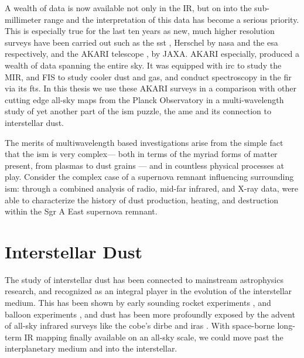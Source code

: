     A wealth of data is now available not only in the IR, but on into the sub-millimeter range and the interpretation of this data has become a serious priority. This is especially true for the last ten years as new, much higher resolution surveys have been carried out such as the \acrlong{sst} \cite{spitzer04}, \acrlong{Herschel} \citep{herschel10} by \acrshort{nasa} and the \acrshort{esa} respectively, and the AKARI telescope \citep{akari07},  by JAXA. AKARI especially, produced a wealth of data spanning the entire sky. It was equipped with \acrshort{irc} \citep{irc07} to study the MIR, and FIS \citep{fis07} to study cooler dust and gas, and conduct spectroscopy in the \acrlong{fir} via its \acrlong{fts}. In this thesis we use these AKARI surveys in a comparison with other cutting edge all-sky maps from the Planck Observatory in a multi-wavelength study of yet another part of the \acrshort{ism} puzzle, the \acrshort{ame} and its connection to interstellar dust.

    The merits of multiwavelength based investigations arise from the simple fact that the \acrshort{ism} is very complex--- both in terms of the myriad forms of matter present, from plasmas to dust grains --- and in countless physical processes at play. Consider the complex case of a supernova remnant influencing surrounding \acrshort{ism}: through a combined analysis of radio, mid-far infrared, and X-ray data, \cite{lau15} were able to characterize the history of dust production, heating, and destruction within the Sgr A East supernova remnant.


\section{Interstellar Dust}

    The study of interstellar dust has been connected to mainstream astrophysics research, and recognized as an integral player in the evolution of the interstellar medium. This has been shown by early sounding rocket experiments \citep{wolstencroft67,soifer71}, and balloon experiments \citep{muehlner70,emerson73}, and dust has been more profoundly exposed by the advent of all-sky infrared surveys like the \acrlong{cobe}'s \acrlong{dirbe} \citep{sodroski94} and \acrshort{iras} \citep{iras84}.
    With space-borne long-term IR mapping finally available on an all-sky scale, we could move past the interplanetary medium and into the interstellar.

